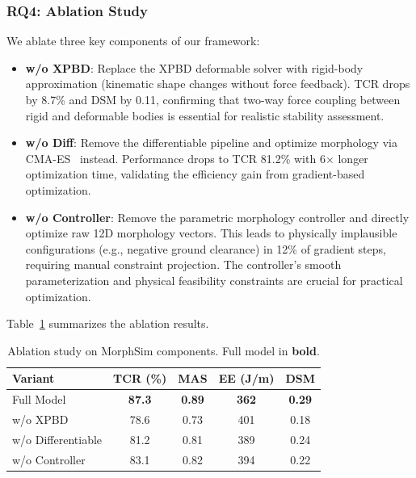 \subsubsection{RQ4: Ablation Study}

We ablate three key components of our framework:

\begin{itemize}
    \item \textbf{w/o XPBD}: Replace the XPBD deformable solver with rigid-body approximation (kinematic shape changes without force feedback). TCR drops by 8.7\% and DSM by 0.11, confirming that two-way force coupling between rigid and deformable bodies is essential for realistic stability assessment.

    \item \textbf{w/o Diff}: Remove the differentiable pipeline and optimize morphology via CMA-ES~\cite{hansen2006cma} instead. Performance drops to TCR 81.2\% with 6$\times$ longer optimization time, validating the efficiency gain from gradient-based optimization.

    \item \textbf{w/o Controller}: Remove the parametric morphology controller and directly optimize raw 12D morphology vectors. This leads to physically implausible configurations (e.g., negative ground clearance) in 12\% of gradient steps, requiring manual constraint projection. The controller's smooth parameterization and physical feasibility constraints are crucial for practical optimization.
\end{itemize}

Table~\ref{tab:ablation} summarizes the ablation results.

\begin{table}[t]
\centering
\caption{Ablation study on MorphSim components. Full model in \textbf{bold}.}
\label{tab:ablation}
\begin{tabular}{lcccc}
\toprule
Variant & TCR (\%) & MAS & EE (J/m) & DSM \\
\midrule
Full Model            & \textbf{87.3} & \textbf{0.89} & \textbf{362} & \textbf{0.29} \\
w/o XPBD              & 78.6 & 0.73 & 401 & 0.18 \\
w/o Differentiable    & 81.2 & 0.81 & 389 & 0.24 \\
w/o Controller        & 83.1 & 0.82 & 394 & 0.22 \\
\bottomrule
\end{tabular}
\end{table}

